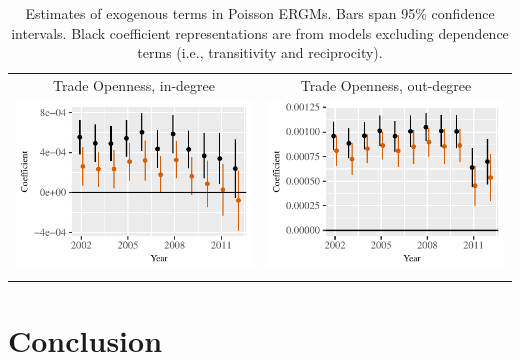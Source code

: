 \documentclass[reqno,onecolumn,letterpaper,12pt]{article}
\begin{document}
\begin{longtable}{c@{\hskip -.4cm}c}
Trade Openness, in-degree &
Trade Openness,  out-degree\\
\includegraphics[height=.2\textheight, clip=true, trim=0cm .5cm 0cm .1cm]{draft_figures/rl_plots/TradeO_in.pdf}  &
\includegraphics[height=.2\textheight, clip=true, trim=.5cm .5cm 0cm .1cm]{draft_figures/rl_plots/TradeO_out.pdf}   \\

\caption{\label{fig:effectPlots1} Estimates of exogenous terms in Poisson ERGMs. Bars span 95\% confidence intervals. Black coefficient representations are from models excluding dependence terms (i.e., transitivity and reciprocity).}

\end{longtable}












\section{Conclusion}
\end{document}
